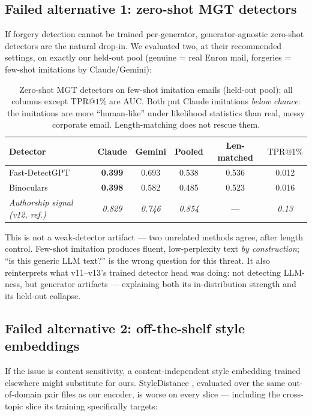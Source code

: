 \documentclass[11pt]{article}
\makeatletter
\newcommand{\tprat}[1]{\ensuremath{\mathrm{TPR}@#1\%}}
\makeatother
\begin{document}
\subsection{Failed alternative 1: zero-shot MGT detectors}
\label{sec:pivots}
If forgery detection cannot be trained per-generator, generator-agnostic zero-shot detectors are
the natural drop-in. We evaluated two, at their recommended settings, on exactly our held-out pool
(genuine = real Enron mail, forgeries = few-shot imitations by Claude/Gemini):

\begin{table}[h]
\centering
\small
\begin{tabular}{lccccc}
\toprule
Detector & Claude & Gemini & Pooled & Len-matched & \tprat{1} \\
\midrule
Fast-DetectGPT & \textbf{0.399} & 0.693 & 0.538 & 0.536 & 0.012 \\
Binoculars & \textbf{0.398} & 0.582 & 0.485 & 0.523 & 0.016 \\
\emph{Authorship signal (v12, ref.)} & \emph{0.829} & \emph{0.746} & \emph{0.854} & --- & \emph{0.13} \\
\bottomrule
\end{tabular}
\caption{Zero-shot MGT detectors on few-shot imitation emails (held-out pool); all columns except
\tprat{1} are AUC. Both put Claude imitations \emph{below chance}: the imitations are more
``human-like'' under likelihood statistics than real, messy corporate email. Length-matching does
not rescue them.}
\label{tab:zeroshot}
\end{table}

This is not a weak-detector artifact --- two unrelated methods agree, after length control. Few-shot
imitation produces fluent, low-perplexity text \emph{by construction}; ``is this generic LLM
text?'' is the wrong question for this threat. It also reinterprets what v11--v13's trained
detector head was doing: not detecting LLM-ness, but generator artifacts --- explaining both its
in-distribution strength and its held-out collapse.

\subsection{Failed alternative 2: off-the-shelf style embeddings}
If the issue is content sensitivity, a content-independent style embedding trained elsewhere might
substitute for ours. StyleDistance \citep{styledistance2024}, evaluated over the same
out-of-domain pair files as our encoder, is worse on every slice --- including the cross-topic slice
its training specifically targets:
\end{document}
